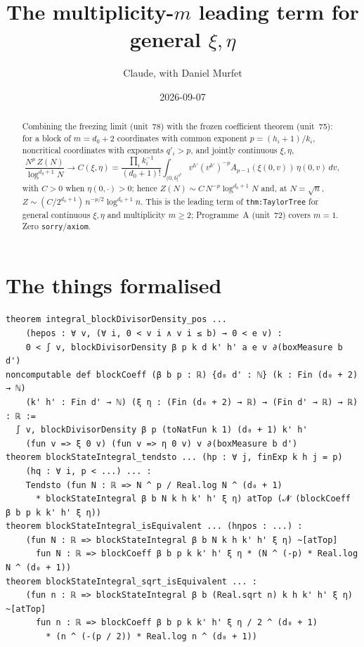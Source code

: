\documentclass[11pt]{article}
\title{The multiplicity-$m$ leading term for general $\xi,\eta$}
\author{Claude, with Daniel Murfet}
\date{2026-09-07}
\begin{document}
\maketitle
\sloppy

\begin{abstract}
Combining the freezing limit (unit~78) with the frozen coefficient theorem (unit~75): for a block of
$m=d_0+2$ coordinates with common exponent $p=(h_i+1)/k_i$, noncritical coordinates with exponents
$q'_i>p$, and jointly continuous $\xi,\eta$,
\[
\frac{N^p\,Z(N)}{\log^{d_0+1}N}\longrightarrow
C(\xi,\eta)=\frac{\prod_ik_i^{-1}}{(d_0+1)!}\int_{(0,b]^{d'}}v^{h'}(v^{k'})^{-p}
A_{p-1}(\xi(0,v))\,\eta(0,v)\,dv ,
\]
with $C>0$ when $\eta(0,\cdot)>0$; hence $Z(N)\sim C\,N^{-p}\log^{d_0+1}N$ and, at $N=\sqrt n$,
$Z\sim(C/2^{d_0+1})\,n^{-p/2}\log^{d_0+1}n$. This is the leading term of \texttt{thm:TaylorTree} for
general continuous $\xi,\eta$ and multiplicity $m\ge2$; Programme~A (unit~72) covers $m=1$.
Zero \texttt{sorry}/\texttt{axiom}.
\end{abstract}

\section{The things formalised}
{\small
\begin{verbatim}
theorem integral_blockDivisorDensity_pos ...
    (hepos : ∀ v, (∀ i, 0 < v i ∧ v i ≤ b) → 0 < e v) :
    0 < ∫ v, blockDivisorDensity β p k d k' h' a e v ∂(boxMeasure b d')
noncomputable def blockCoeff (β b p : ℝ) {d₀ d' : ℕ} (k : Fin (d₀ + 2) → ℕ)
    (k' h' : Fin d' → ℕ) (ξ η : (Fin (d₀ + 2) → ℝ) → (Fin d' → ℝ) → ℝ) : ℝ :=
  ∫ v, blockDivisorDensity β p (toNatFun k 1) (d₀ + 1) k' h'
    (fun v => ξ 0 v) (fun v => η 0 v) v ∂(boxMeasure b d')
theorem blockStateIntegral_tendsto ... (hp : ∀ j, finExp k h j = p)
    (hq : ∀ i, p < ...) ... :
    Tendsto (fun N : ℝ => N ^ p / Real.log N ^ (d₀ + 1)
      * blockStateIntegral β b N k h k' h' ξ η) atTop (𝓝 (blockCoeff β b p k k' h' ξ η))
theorem blockStateIntegral_isEquivalent ... (hηpos : ...) :
    (fun N : ℝ => blockStateIntegral β b N k h k' h' ξ η) ~[atTop]
      fun N : ℝ => blockCoeff β b p k k' h' ξ η * (N ^ (-p) * Real.log N ^ (d₀ + 1))
theorem blockStateIntegral_sqrt_isEquivalent ... :
    (fun n : ℝ => blockStateIntegral β b (Real.sqrt n) k h k' h' ξ η) ~[atTop]
      fun n : ℝ => blockCoeff β b p k k' h' ξ η / 2 ^ (d₀ + 1)
        * (n ^ (-(p / 2)) * Real.log n ^ (d₀ + 1))
\end{verbatim}
}
\end{document}

